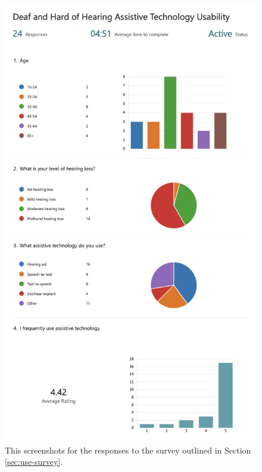 \documentclass{l4proj}
\begin{document}
\begin{appendices}
\begin{figure}[H]
    \centering
    \includegraphics[width=0.75\linewidth]{dissertation/images/use-survey-1.jpeg}    
    \caption{This screenshots for the responses to the survey outlined in Section \ref{sec:use-survey}.}
    \label{fig:use-survey-1} 
\end{figure}


\end{appendices}
\end{document}
